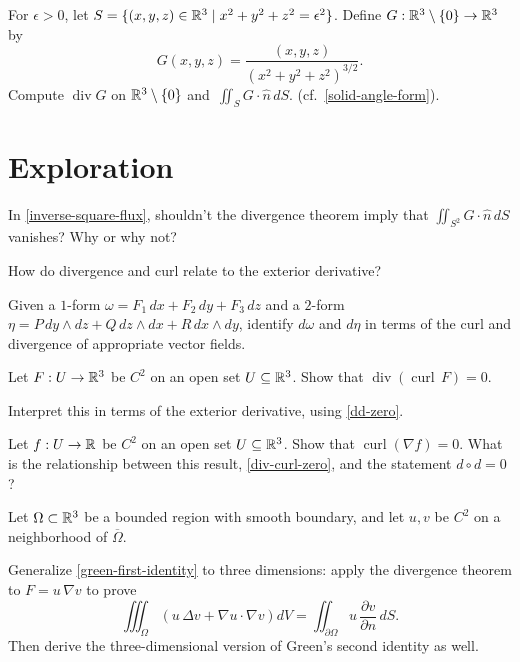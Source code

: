 \documentclass{homework}
\begin{document}
\begin{problem}\label{inverse-square-flux}%
  For $\epsilon > 0$, let $S = \{ (x,y,z) \in \mathbb{R}^3 \mid x^2 + y^2 + z^2 = \epsilon^2 \}$. Define $G : \mathbb{R}^3 \setminus \{0\} \to \mathbb{R}^3$ by
  \[
    G(x,y,z) = \frac{(x,y,z)}{(x^2+y^2+z^2)^{3/2}}.
  \]
  Compute $\operatorname{div} G$ on $\mathbb{R}^3 \setminus \{0\}$ and~$\displaystyle\iint_{S} G \cdot \hat{n}\,dS$. (cf.~\ref{solid-angle-form}).
\end{problem}

\section{Exploration}

\begin{problem}
  In \ref{inverse-square-flux}, shouldn't the divergence theorem imply that $\displaystyle\iint_{S^2} G\cdot\hat{n}\,dS$ vanishes? Why or why not?
  \end{problem}

\begin{problem}
  How do divergence and curl relate to the exterior derivative?

  Given a $1$-form $\omega = F_1\,dx + F_2\,dy + F_3\,dz$ and a $2$-form $\eta = P\,dy\wedge dz + Q\,dz\wedge dx + R\,dx\wedge dy$, identify $d\omega$ and $d\eta$ in terms of the curl and divergence of appropriate vector fields.
\end{problem}


\begin{problem}\label{div-curl-zero}%
  Let $F:U\to\mathbb{R}^3$ be $C^2$ on an open set $U\subseteq\mathbb{R}^3$.
  Show that $\operatorname{div}(\operatorname{curl}\, F) = 0$.

  Interpret this in terms of the exterior derivative, using \ref{dd-zero}.
\end{problem}

\begin{problem}\label{curl-grad-zero}%
  Let $f:U\to\mathbb{R}$ be $C^2$ on an open set $U\subseteq\mathbb{R}^3$.
  Show that $\operatorname{curl}(\nabla f) = 0$.  What is the relationship between this result, \ref{div-curl-zero}, and the statement $d \circ d = 0$?
\end{problem}

\begin{problem}\label{green-3d-identities}%
  Let $\Omega\subset\mathbb{R}^3$ be a bounded region with smooth boundary, and let $u,v$ be $C^2$ on a neighborhood of $\overline{\Omega}$.

  Generalize \ref{green-first-identity} to three dimensions: apply the divergence theorem to $F = u\,\nabla v$ to prove
  \[
    \iiint_\Omega \left(u\,\Delta v + \nabla u \cdot \nabla v\right) dV = \iint_{\partial\Omega} u\,\frac{\partial v}{\partial n}\,dS.
  \]
  Then derive the three-dimensional version of Green's second identity as well.
\end{problem}
\end{document}
